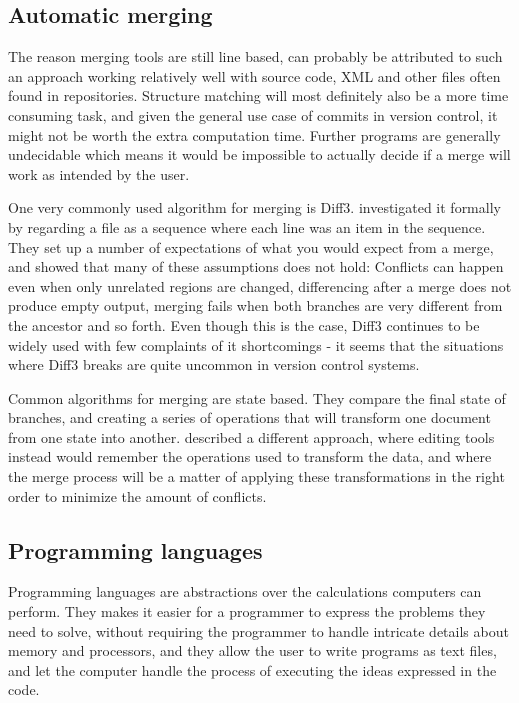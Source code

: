 \documentclass[11pt]{article}
\begin{document}
\subsection{Automatic merging}
The reason merging tools are still line based, can probably be attributed to such an approach working relatively well with source code, XML and other files often found in repositories. Structure matching will most definitely also be a more time consuming task, and given the general use case of commits in version control, it might not be worth the extra computation time. Further programs are generally undecidable which means it would be impossible to actually decide if a merge will work as intended by the user.

One very commonly used algorithm for merging is Diff3. \citet{Khanna} investigated it formally by regarding a file as a sequence where each line was an item in the sequence. They set up a number of expectations of what you would expect from a merge, and showed that many of these assumptions does not hold: Conflicts can happen even when only unrelated regions are changed, differencing after a merge does not produce empty output, merging fails when both branches are very different from the ancestor and so forth. Even though this is the case, Diff3 continues to be widely used with few complaints of it shortcomings - it seems that the situations where Diff3 breaks are quite uncommon in version control systems.

Common algorithms for merging are state based. They compare the final state of branches, and creating a series of operations that will transform one document from one state into another. \citet{Lippe} described a different approach, where editing tools instead would remember the operations used to transform the data, and where the merge process will be a matter of applying these transformations in the right order to minimize the amount of conflicts.



\subsection{Programming languages}
Programming languages are abstractions over the calculations computers can perform. They makes it easier for a programmer to express the problems they need to solve, without requiring the programmer to handle intricate details about memory and processors, and they allow the user to write programs as text files, and let the computer handle the process of executing the ideas expressed in the code.
\end{document}
